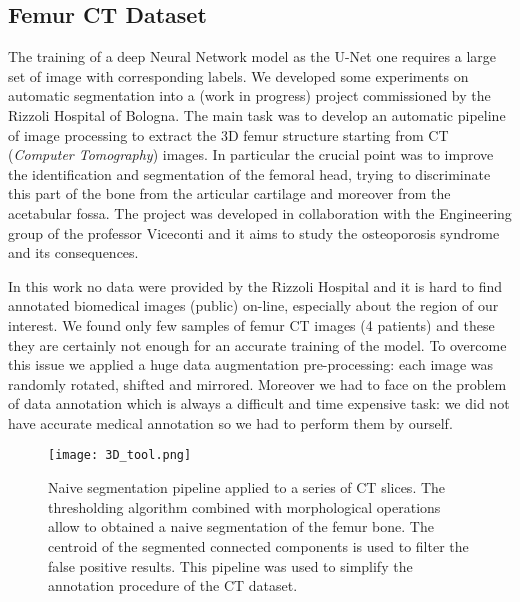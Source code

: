 \documentclass{standalone}
\begin{document}
\subsection[CT Dataset]{Femur CT Dataset}\label{segmentation:ct}

The training of a deep Neural Network model as the U-Net one requires a large set of image with corresponding labels.
We developed some experiments on automatic segmentation into a (work in progress) project commissioned by the Rizzoli Hospital of Bologna.
The main task was to develop an automatic pipeline of image processing to extract the 3D femur structure starting from CT (\emph{Computer Tomography}) images.
In particular the crucial point was to improve the identification and segmentation of the femoral head, trying to discriminate this part of the bone from the articular cartilage and moreover from the acetabular fossa.
The project was developed in collaboration with the Engineering group of the professor Viceconti and it aims to study the osteoporosis syndrome and its consequences.

In this work no data were provided by the Rizzoli Hospital and it is hard to find annotated biomedical images (public) on-line, especially about the region of our interest.
We found only few samples of femur CT images (4 patients) and these they are certainly not enough for an accurate training of the model.
To overcome this issue we applied a huge data augmentation pre-processing: each image was randomly rotated, shifted and mirrored.
Moreover we had to face on the problem of data annotation which is always a difficult and time expensive task: we did not have accurate medical annotation so we had to perform them by ourself.

\begin{figure}[htbp]
\centering
\texttt{[image: 3D\_tool.png]}
\caption{Naive segmentation pipeline applied to a series of CT slices.
The thresholding algorithm combined with morphological operations allow to obtained a naive segmentation of the femur bone.
The centroid of the segmented connected components is used to filter the false positive results.
This pipeline was used to simplify the annotation procedure of the CT dataset.
}
\label{fig:3D_tool}
\end{figure}
\end{document}
